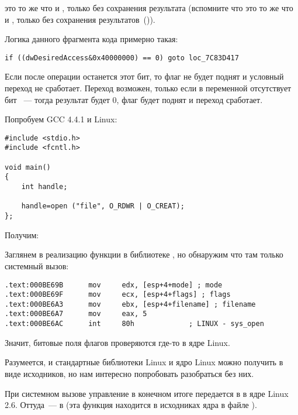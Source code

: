 \TEST это то же что и \AND, только без сохранения результата 
(вспомните что \CMP это то же что и \SUB, только без сохранения результатов~()).

Логика данного фрагмента кода примерно такая:

\begin{lstlisting}[style=customc]
if ((dwDesiredAccess&0x40000000) == 0) goto loc_7C83D417
\end{lstlisting}

Если после операции \AND останется этот бит, то флаг \ZF не будет поднят и условный переход 
\JZ не сработает. 
Переход возможен, только если в переменной  отсутствует бит ~--- 
тогда результат \AND будет 0, флаг \ZF будет поднят и переход сработает.

Попробуем GCC 4.4.1 и Linux:

\begin{lstlisting}[style=customc]
#include <stdio.h>
#include <fcntl.h>

void main()
{
	int handle;

	handle=open ("file", O_RDWR | O_CREAT);
};
\end{lstlisting}

Получим:



Заглянем в реализацию функции  в библиотеке , но обнаружим что там 
только системный вызов:

\begin{lstlisting}[caption=open() (libc.so.6),style=customasmx86]
.text:000BE69B      mov     edx, [esp+4+mode] ; mode
.text:000BE69F      mov     ecx, [esp+4+flags] ; flags
.text:000BE6A3      mov     ebx, [esp+4+filename] ; filename
.text:000BE6A7      mov     eax, 5
.text:000BE6AC      int     80h             ; LINUX - sys_open
\end{lstlisting}

Значит, битовые поля флагов  проверяются где-то в ядре Linux.

Разумеется, и стандартные библиотеки Linux и ядро Linux можно получить в виде исходников, 
но нам интересно попробовать разобраться без них.

При системном вызове  управление в конечном итоге передается в  в ядре Linux 2.6. 
Оттуда~--- в  (эта функция находится в исходниках ядра в файле ).


